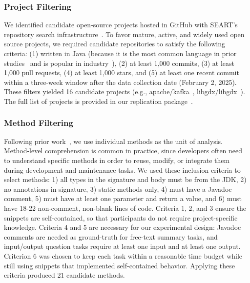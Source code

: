 \subsubsection{Project Filtering}

We identified candidate open-source projects hosted in GitHub with SEART's repository search infrastructure~\cite{seart}.
To favor mature, active, and widely used open source projects, we
required candidate repositories to satisfy the following criteria: (1)
written in Java (because it is the most common language in prior
studies~\cite{Wyrich:ACS23} and is popular in industry~\cite{TIOBEIndex}),
(2) at least 1,000 commits, (3) at least 1,000 pull
requests, (4) at least 1,000 stars, and (5) at least one recent commit
within a three-week window after the data collection date (February 2,
2025).  These filters yielded 16 candidate projects (e.g.,
apache/kafka~\cite{kafka}, libgdx/libgdx~\cite{libgdx}). The full list
of projects is provided in our replication
package~\cite{replication-package}.


\subsubsection{Method Filtering}

Following prior work~\cite{Wyrich:ACS23}, we use individual methods as
the unit of analysis. Method-level comprehension is common in
practice, since developers often need to understand specific methods
in order to reuse, modify, or integrate them during development and
maintenance tasks.
We used these inclusion criteria to select methods:
1) all types in the signature and body must be from the JDK,
2) no annotations in signature, 3) static methods only,
4) must have a Javadoc comment, 5) must have at least one
parameter and return a value, and 6) must have 18-22 non-comment, non-blank
lines of code.
Criteria 1, 2, and 3 ensure the snippets are self-contained,
so that participants do not require project-specific knowledge.
Criteria 4 and 5 are necessary for our experimental design: Javadoc
comments are needed as ground-truth for free-text summary tasks,
and input/output question tasks require at least one input and at
least one output. Criterion 6 was chosen to keep each task within a reasonable time budget while
still using snippets that implemented self-contained behavior.
Applying these criteria produced 21 candidate methods.












